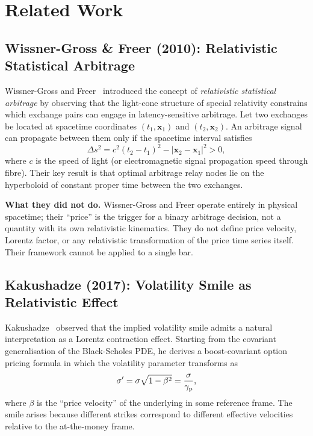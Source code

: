 \section{Related Work}
\label{sec:related}

\subsection{Wissner-Gross \& Freer (2010): Relativistic Statistical Arbitrage}

Wissner-Gross and Freer~\cite{WissnerGross2010} introduced the concept of
\emph{relativistic statistical arbitrage} by observing that the light-cone
structure of special relativity constrains which exchange pairs can engage in
latency-sensitive arbitrage.  Let two exchanges be located at spacetime
coordinates $(t_1, \mathbf{x}_1)$ and $(t_2, \mathbf{x}_2)$.  An arbitrage
signal can propagate between them only if the spacetime interval satisfies
\begin{equation}
  \Delta s^2 = c^2 (t_2 - t_1)^2 - |\mathbf{x}_2 - \mathbf{x}_1|^2 > 0,
\end{equation}
where $c$ is the speed of light (or electromagnetic signal propagation speed
through fibre).  Their key result is that optimal arbitrage relay nodes lie on
the hyperboloid of constant proper time between the two exchanges.

\textbf{What they did not do.}  Wissner-Gross and Freer operate entirely in
physical spacetime; their ``price'' is the trigger for a binary arbitrage
decision, not a quantity with its own relativistic kinematics.  They do not
define price velocity, Lorentz factor, or any relativistic transformation of
the price time series itself.  Their framework cannot be applied to a single
\ohlcv{} bar.

\subsection{Kakushadze (2017): Volatility Smile as Relativistic Effect}

Kakushadze~\cite{Kakushadze2017} observed that the implied volatility smile
admits a natural interpretation as a Lorentz contraction effect.  Starting
from the covariant generalisation of the Black-Scholes PDE, he derives a
boost-covariant option pricing formula in which the volatility parameter
transforms as
\begin{equation}
  \sigma' = \sigma \sqrt{1 - \beta^2} = \frac{\sigma}{\gamma_{\mathrm{p}}},
  \label{eq:kakushadze_vol}
\end{equation}
where $\beta$ is the ``price velocity'' of the underlying in some reference
frame.  The smile arises because different strikes correspond to different
effective velocities relative to the at-the-money frame.

